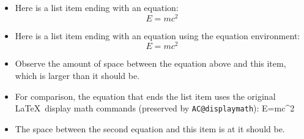 \documentclass{article}
\begin{document}
\begin{itemize}

\item Here is a list item ending with an equation:
\[
E=mc^2
\]

\item Here is a list item ending with an equation using the equation environment:
\begin{equation}
E=mc^2
\end{equation}

\item Observe the amount of space between the equation above and this item, which is larger than it should be.

\item For comparison, the equation that ends the list item uses the original \LaTeX\ display math commands (preserved by \texttt{AC@displaymath}):
\makeatletter
\AC@displaymath
E=mc^2
\AC@enddisplaymath
\makeatother

\item The space between the second equation and this item is at it should be.

\end{itemize}
\end{document}
